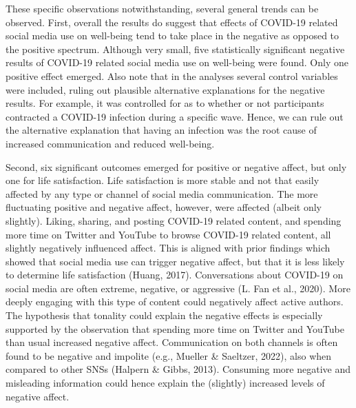 \documentclass[
  man,mask,floatsintext]{apa7}
\begin{document}
These specific observations notwithstanding, several general trends can be observed.
First, overall the results do suggest that effects of COVID-19 related social media use on well-being tend to take place in the negative as opposed to the positive spectrum.
Although very small, five statistically significant negative results of COVID-19 related social media use on well-being were found.
Only one positive effect emerged.
Also note that in the analyses several control variables were included, ruling out plausible alternative explanations for the negative results.
For example, it was controlled for as to whether or not participants contracted a COVID-19 infection during a specific wave.
Hence, we can rule out the alternative explanation that having an infection was the root cause of increased communication and reduced well-being.

Second, six significant outcomes emerged for positive or negative affect, but only one for life satisfaction.
Life satisfaction is more stable and not that easily affected by any type or channel of social media communication.
The more fluctuating positive and negative affect, however, were affected (albeit only slightly).
Liking, sharing, and posting COVID-19 related content, and spending more time on Twitter and YouTube to browse COVID-19 related content, all slightly negatively influenced affect.
This is aligned with prior findings which showed that social media use can trigger negative affect, but that it is less likely to determine life satisfaction (Huang, 2017).
Conversations about COVID-19 on social media are often extreme, negative, or aggressive (L. Fan et al., 2020).
More deeply engaging with this type of content could negatively affect active authors.
The hypothesis that tonality could explain the negative effects is especially supported by the observation that spending more time on Twitter and YouTube than usual increased negative affect.
Communication on both channels is often found to be negative and impolite (e.g., Mueller \& Saeltzer, 2022), also when compared to other SNSs (Halpern \& Gibbs, 2013).
Consuming more negative and misleading information could hence explain the (slightly) increased levels of negative affect.
\end{document}
